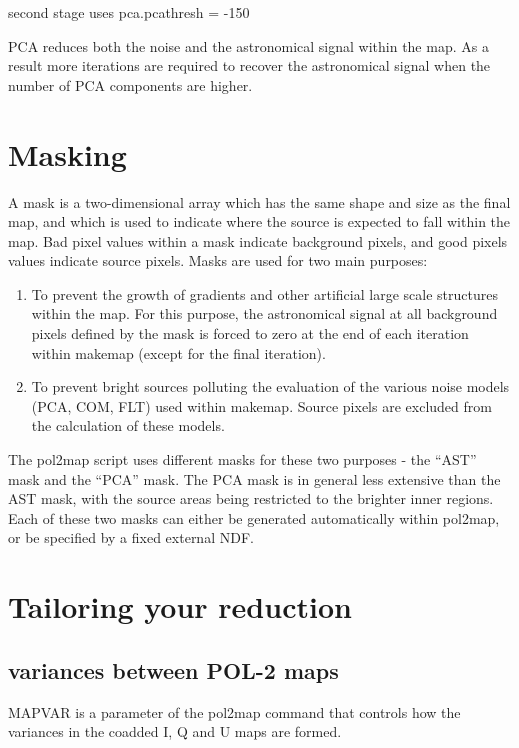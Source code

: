 second stage uses pca.pcathresh = -150


PCA reduces both the noise and the astronomical signal within the map. As
a result more iterations are required to recover the astronomical signal
when the number of PCA components are higher.



\section{Masking}
A mask is a two-dimensional array which has the same shape and size as the final map, and
which is used to indicate where the source is expected to fall within the map. Bad pixel values
within a mask indicate background pixels, and good pixels values indicate source pixels. Masks
are used for two main purposes:

\begin{enumerate}\itemsep-0.2em
\item To prevent the growth of gradients and other artificial large scale structures within the
map.  For this purpose, the astronomical signal at all background pixels defined by the
mask is forced to zero at the end of each iteration within makemap (except for the final iteration).
\item To prevent bright sources polluting the evaluation of the various noise models (PCA, COM, FLT) used within
makemap. Source pixels are excluded from the calculation of these models.
\end{enumerate}


The pol2map script uses different masks for these two purposes - the “AST” mask and the “PCA” mask.
The PCA mask is in general less extensive than the AST mask, with the source areas being restricted to the brighter inner regions.
Each of these two masks can either be generated automatically within pol2map, or be specified by
a fixed external NDF.



\section{Tailoring your reduction}

\subsection*{variances between POL-2 maps}

MAPVAR is a parameter of the pol2map command that controls how the variances in the coadded
I, Q and U maps are formed.

